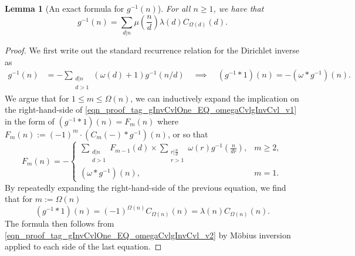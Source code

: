 \documentclass[11pt,reqno,a4letter]{article}
\numberwithin{figure}{section}
\numberwithin{table}{section}
\theoremstyle{plain}
\newtheorem{lemma}[theorem]{Lemma}
\numberwithin{theorem}{section}
\theoremstyle{definition}
\begin{document}
\begin{lemma}[An exact formula for $g^{-1}(n)$] 
\label{lemma_AnExactFormulaFor_gInvByMobiusInv_v1} 
For all $n \geq 1$, we have that 
\[
g^{-1}(n) = \sum_{d|n} \mu\left(\frac{n}{d}\right) \lambda(d) C_{\Omega(d)}(d). 
\]
\end{lemma}
\begin{proof} 
We first write out the standard recurrence relation for the Dirichlet inverse as 
\begin{align} 
\label{eqn_proof_tag_gInvCvlOne_EQ_omegaCvlgInvCvl_v1} 
g^{-1}(n) & = - \sum_{\substack{d|n \\ d>1}} (\omega(d) + 1) g^{-1}(n/d) 
     \quad\implies\quad 
     (g^{-1} \ast 1)(n) = -(\omega \ast g^{-1})(n). 
\end{align} 
We argue that for $1 \leq m \leq \Omega(n)$, we can inductively expand the 
implication on the right-hand-side of \eqref{eqn_proof_tag_gInvCvlOne_EQ_omegaCvlgInvCvl_v1} 
in the form of $(g^{-1} \ast 1)(n) = F_m(n)$ where 
$F_m(n) := (-1)^{m} \cdot (C_m(-) \ast g^{-1})(n)$, or so that 
\[
F_m(n) = - 
     \begin{cases} 
     \sum\limits_{\substack{d|n \\ d > 1}} F_{m-1}(d) \times \sum\limits_{\substack{r|\frac{n}{d} \\ r > 1}} 
     \omega(r) g^{-1}\left(\frac{n}{dr}\right), & m \geq 2, \\ 
     (\omega \ast g^{-1})(n), & m = 1. 
     \end{cases} 
\]
By repeatedly expanding the right-hand-side of the previous equation, 
we find that for $m := \Omega(n)$ 
\begin{equation} 
\label{eqn_proof_tag_gInvCvlOne_EQ_omegaCvlgInvCvl_v2} 
(g^{-1} \ast 1)(n) = (-1)^{\Omega(n)} C_{\Omega(n)}(n) = \lambda(n) C_{\Omega(n)}(n). 
\end{equation} 
The formula then follows from \eqref{eqn_proof_tag_gInvCvlOne_EQ_omegaCvlgInvCvl_v2} 
by M\"obius inversion applied to each side of the last equation. 
\end{proof} 
\end{document}
